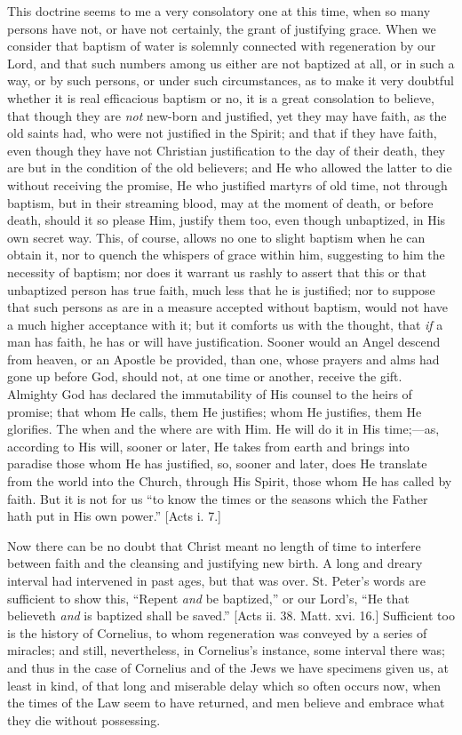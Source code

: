 This doctrine seems to me a very consolatory one at this time, when
so many persons have not, or have not certainly, the grant of
justifying grace. When we consider that baptism of water is solemnly
connected with regeneration by our Lord, and that such numbers among
us either are not baptized at all, or in such a way, or by such
persons, or under such circumstances, as to make it very doubtful
whether it is real efficacious baptism or no, it is a great
consolation to believe, that though they are \emph{not} new-born and
justified, yet they may have faith, as the old saints had, who were
not justified in the Spirit; and that if they have faith, even though
they have not Christian justification to the day of their death, they
are but in the condition of the old believers; and He who allowed the
latter to die without receiving the promise, He who justified martyrs
of old time, not through baptism, but in their streaming blood, may at
the moment of death, or before death, should it so please Him, justify
them too, even though unbaptized, in His own secret way. This, of
course, allows no one to slight baptism when he can obtain it, nor to
quench the whispers of grace within him, suggesting to him the
necessity of baptism; nor does it warrant us rashly to assert that
this or that unbaptized person has true faith, much less that he is
justified; nor to suppose that such persons as are in a measure
accepted without baptism, would not have a much higher acceptance with
it; but it comforts us with the thought, that \emph{if} a man has
faith, he has or will have justification. Sooner would an Angel
descend from heaven, or an Apostle be provided, than one, whose
prayers and alms had gone up before God, should not, at one time or
another, receive the gift. Almighty God has declared the immutability
of His counsel to the heirs of promise; that whom He calls, them He
justifies; whom He justifies, them He glorifies. The when and the
where are with Him. He will do it in His time;—as, according to His
will, sooner or later, He takes from earth and brings into paradise
those whom He has justified, so, sooner and later, does He translate
from the world into the Church, through His Spirit, those whom He has
called by faith. But it is not for us ``to know the times or the
seasons which the Father hath put in His own power.'' [Acts i. 7.]

Now there can be no doubt that Christ meant no length of time to
interfere between faith and the cleansing and justifying new birth. A
long and dreary interval had intervened in past ages, but that was
over. St. Peter's words are sufficient to show this, ``Repent
\emph{and}
be baptized,'' or our Lord's, ``He that believeth \emph{and}
is baptized shall be saved.'' [Acts ii. 38. Matt. xvi. 16.]
Sufficient too is the history of Cornelius, to whom regeneration was
conveyed by a series of miracles; and still, nevertheless, in
Cornelius's instance, some interval there was; and thus in the case of
Cornelius and of the Jews we have specimens given us, at least in
kind, of that long and miserable delay which so often occurs now, when
the times of the Law seem to have returned, and men believe and
embrace what they die without possessing.

